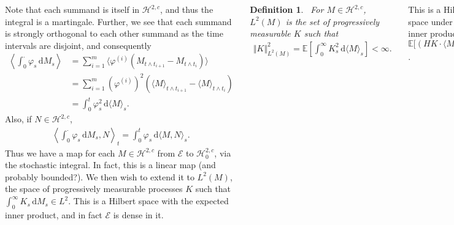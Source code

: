 \documentclass{tikzposter} %
\newtheorem{lemma}[theorem]{Lemma}
\newtheorem{definition}{Definition}
\begin{document}
\begin{columns}
{      Note that each summand is itself in $\mathcal{H}^{2,c}$, and thus the integral is a martingale. Further, we see that each summand is strongly orthogonal to each other summand as the time intervals are disjoint, and consequently
      \begin{align*}
        \left\langle \int_{0}^{\cdot} \varphi_{s} \, \mathrm{d}M_{s} \right\rangle &= \sum_{i=1}^{m} \langle \varphi^{(i)}(M_{t \land t_{i+1}}-M_{t \land t_{i}}) \rangle \\
                                                                    &= \sum_{i=1}^{m} (\varphi^{(i)})^{2}(\langle M \rangle_{t \land t_{i+1}} - \langle M \rangle_{t \land t_{i}}) \\
        &= \int_{0}^{t} \varphi^{2}_{s} \, \mathrm{d} \langle M \rangle_{s}.
      \end{align*}
      Also, if $N \in \mathcal{H}^{2,c}$,
      \begin{align*}
        \left\langle \int_{0}^{\cdot} \varphi_{s} \, \mathrm{d}M_{s}, N \right\rangle_{t} = \int_{0}^{t} \varphi_{s} \, \mathrm{d}\langle M, N \rangle_{s}.
      \end{align*}
      Thus we have a map for each $M \in \mathcal{H}^{2,c}$ from $\mathcal{E}$ to $\mathcal{H}^{2,c}_{0}$, via the stochastic integral. In fact, this is a linear map (and probably bounded?). We then wish to extend it to $L^{2}(M)$, the space of progressively measurable processes $K$ such that $\int_{0}^{\infty} K_{s} \, \mathrm{d}M_{s} \in L^{2}$. This is a Hilbert space with the expected inner product, and in fact $\mathcal{E}$ is dense in it. \\

      \begin{definition}
      \ For $M \in \mathcal{H}^{2,c}$, $L^{2}(M)$ is the set of progressively measurable $K$ such that
      \begin{align*}
        \Vert K \Vert^{2}_{L^{2}(M)} = \mathbb{E}\left[\int_{0}^{\infty} K^{2}_{s} \, \mathrm{d}\langle M \rangle_{s}\right] < \infty.
      \end{align*}
      \end{definition}
      \hphantom{}

      This is a Hilbert space under the inner product $\mathbb{E}\big[(HK \cdot \langle M \rangle)_{\infty}\big]$. \\

      \begin{lemma}
      \ Let $M \in \mathcal{H}^{2,c}$. Then $\mathcal{E}$ is a dense vector subspace of $L^{2}(M)$.
      \end{lemma}
      \hphantom{}

}
\end{columns}
\end{document}
